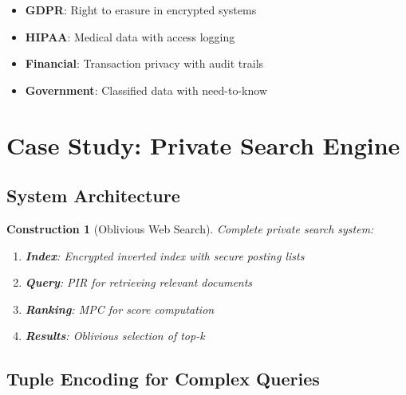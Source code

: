 \documentclass[11pt,final]{article}
\newtheorem{construction}[theorem]{Construction}
\begin{document}
\begin{itemize}
    \item \textbf{GDPR}: Right to erasure in encrypted systems
    \item \textbf{HIPAA}: Medical data with access logging
    \item \textbf{Financial}: Transaction privacy with audit trails
    \item \textbf{Government}: Classified data with need-to-know
\end{itemize}

\section{Case Study: Private Search Engine}

\subsection{System Architecture}

\begin{construction}[Oblivious Web Search]
Complete private search system:
\begin{enumerate}
    \item \textbf{Index}: Encrypted inverted index with secure posting lists
    \item \textbf{Query}: PIR for retrieving relevant documents
    \item \textbf{Ranking}: MPC for score computation
    \item \textbf{Results}: Oblivious selection of top-k
\end{enumerate}
\end{construction}

\subsection{Tuple Encoding for Complex Queries}
\end{document}
